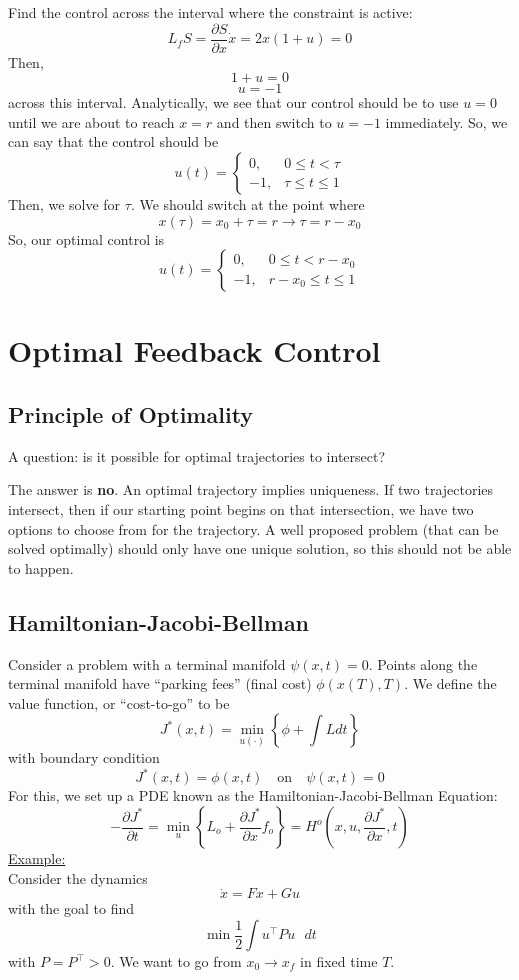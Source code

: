 \documentclass{article}
\begin{document}
\noindent
Find the control across the interval where the constraint is active:
\[L_f S = \frac{\partial S}{\partial x}\dot{x} = 2x(1+u) = 0\]
Then,
\[1 + u = 0\]
\[u = -1\]
across this interval. Analytically, we see that our control should be
to use $u = 0$ until we are about to reach $x = r$ and then switch to $u = -1$
immediately. So, we can say that the control should be
\[u(t) = \begin{cases}
    0, & 0 \le t < \tau \\
    -1, & \tau \le t \le 1
\end{cases}\]
Then, we solve for $\tau$. We should switch at the point where
\[x(\tau) = x_0 + \tau = r \rightarrow \tau = r - x_0\]
So, our optimal control is
\[u(t) = \begin{cases}
    0, & 0 \le t < r - x_0 \\
    -1, & r - x_0 \le t \le 1
\end{cases}\]

\section{Optimal Feedback Control}

\subsection{Principle of Optimality}

\noindent
A question: is it possible for optimal trajectories to intersect?

\noindent
The answer is \textbf{no}. An optimal trajectory implies uniqueness.
If two trajectories intersect, then if our starting point begins on that intersection,
we have two options to choose from for the trajectory. A well proposed
problem (that can be solved optimally) should only have one unique solution,
so this should not be able to happen.

\subsection{Hamiltonian-Jacobi-Bellman}

\noindent
Consider a problem with a terminal manifold $\psi(x,t) = 0$. Points along the terminal
manifold have ``parking fees'' (final cost) $\phi(x(T),T)$. We define the value function,
or ``cost-to-go'' to be
\[J^*(x,t) = \min_{u(\cdot)}\left\{\phi + \int Ldt\right\}\]
with boundary condition
\[J^*(x,t) = \phi(x,t) \quad \text{on} \quad \psi(x,t) = 0\]
For this, we set up a PDE known as the Hamiltonian-Jacobi-Bellman Equation:
\[-\frac{\partial J^*}{\partial t} = \min_{u}\left\{L_o + \frac{\partial J^*}{\partial x}f_o\right\}
= H^o\left(x,u,\frac{\partial J^*}{\partial x},t\right)\]
\underline{Example:}\\[2mm]
Consider the dynamics
\[\dot{x} = Fx + Gu\]
with the goal to find
\[\min \frac{1}{2}\int u^\top Pu\text{ }dt\]
with $P = P^\top > 0$. We want to go from $x_0 \rightarrow x_f$ in fixed time $T$.
\end{document}
